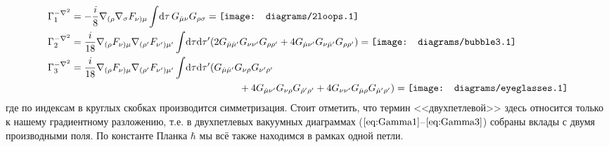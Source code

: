 \begin{align}
	\label{eq:Gamma1}
	\Gamma_1^{-\nabla^2} &= -\frac i8 \nabla_{(\rho}\nabla_\sigma F_{\nu)\mu}\int\!\D \tau\, G_{\dot{\mu} \nu}G_{\rho
 \sigma}=
	\begin{gathered}
		\texttt{[image: diagrams/2loops.1]}	
	\end{gathered}
	\\
	\label{eq:Gamma2}
	\Gamma_2^{-\nabla^2} &= \frac{i}{18}\nabla_{(\rho}F_{\nu)\mu}\nabla_{(\rho'}F_{\nu')\mu'} \int\!\D \tau \D \tau' ( 2 G_{\dot{\mu}\dot{\mu}'}G_{\nu \nu'}G_{\rho \rho'} + 4 G_{\dot{\mu}\nu'}G_{\nu \dot{\mu}'}G_{\rho \rho'})=
	\begin{gathered}
		\texttt{[image: diagrams/bubble3.1]}	
	\end{gathered}
	\\
	\label{eq:Gamma3}
	\Gamma_3^{-\nabla^2} &= \frac{i}{18}\nabla_{(\rho}F_{\nu)\mu}\nabla_{(\rho'}F_{\nu')\mu'} \int\!\D \tau \D \tau' ( G_{\dot{\mu}\dot{\mu}'}G_{\nu \rho}G_{\nu' \rho'}\nonumber\\
	&\hspace{6cm}+ 4 G_{\dot{\mu}\nu'}G_{\nu \rho}G_{\dot{\rho}' \rho'} + 4 G_{\nu \nu'} G_{\dot{\mu}\rho}G_{\dot{\mu}' \rho'})=
	\begin{gathered}
		\texttt{[image: diagrams/eyeglasses.1]}
	\end{gathered}
\end{align}
где по индексам в круглых скобках производится симметризация.
Стоит отметить, что термин <<двухпетлевой>> здесь относится только к нашему градиентному разложению, т.е. в двухпетлевых вакуумных диаграммах ($\ref{eq:Gamma1}$--$\ref{eq:Gamma3}$) собраны вклады с двумя производными поля. По константе Планка $\hbar$ мы всё также находимся в рамках одной петли.

